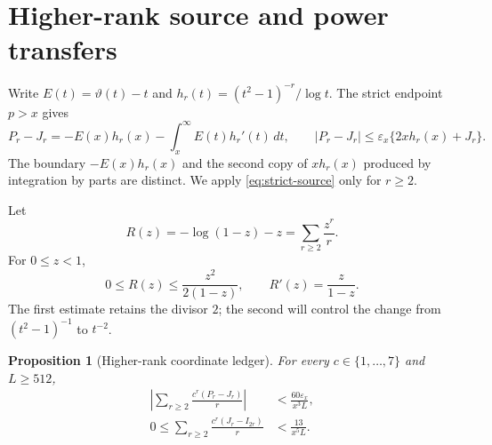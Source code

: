\documentclass[11pt]{article}
\newtheorem{proposition}[theorem]{Proposition}
\theoremstyle{definition}
\theoremstyle{remark}
\newcommand{\eps}{\varepsilon}
\begin{document}
\section{Higher-rank source and power transfers}

Write $E(t)=\vartheta(t)-t$ and
$h_r(t)=(t^2-1)^{-r}/\log t$.  The strict endpoint $p>x$ gives
\begin{equation}
 P_r-J_r=-E(x)h_r(x)-\int_x^\infty E(t)h_r'(t)\,dt,
 \qquad
 |P_r-J_r|\le\eps_x\{2xh_r(x)+J_r\}.
 \label{eq:strict-source}
\end{equation}
The boundary $-E(x)h_r(x)$ and the second copy of $xh_r(x)$ produced by
integration by parts are distinct.  We apply \eqref{eq:strict-source}
only for $r\ge2$.

Let
\begin{equation}
 R(z)=-\log(1-z)-z=\sum_{r\ge2}\frac{z^r}{r}.
 \label{eq:R}
\end{equation}
For $0\le z<1$,
\begin{equation}
 0\le R(z)\le\frac{z^2}{2(1-z)},
 \qquad R'(z)=\frac{z}{1-z}.
 \label{eq:R-bounds}
\end{equation}
The first estimate retains the divisor $2$; the second will control the
change from $(t^2-1)^{-1}$ to $t^{-2}$.

\begin{proposition}[Higher-rank coordinate ledger]
\label{prop:coordinates}
For every $c\in\{1,\ldots,7\}$ and $L\ge512$,
\begin{align}
 \left|\sum_{r\ge2}\frac{c^r(P_r-J_r)}r\right|
 &<\frac{60\eps_x}{x^3L},
 \label{eq:source60}\\
 0\le\sum_{r\ge2}\frac{c^r(J_r-I_{2r})}r
 &<\frac{13}{x^5L}.
 \label{eq:power13}
\end{align}
\end{proposition}
\end{document}
